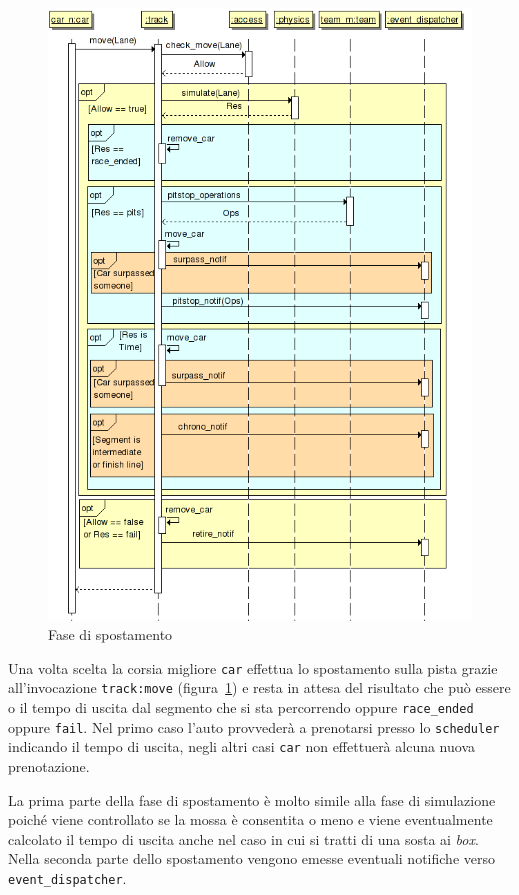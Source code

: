 \documentclass[11pt,a4paper]{report}
\newcommand{\fun}[1]{\texttt{#1}}
\begin{document}
\begin{figure}
\includegraphics[width=\textwidth]{diagrammi/Move}
\caption{Fase di spostamento}
\label{fig:move}
\end{figure}

Una volta scelta la corsia migliore \texttt{car} effettua lo spostamento sulla pista grazie all'invocazione \fun{track:move} (figura~\ref{fig:move}) e resta in attesa del risultato che può essere o il tempo di uscita dal segmento che si sta percorrendo oppure \texttt{race\_ended} oppure \texttt{fail}. Nel primo caso l'auto provvederà a prenotarsi presso lo \texttt{scheduler} indicando il tempo di uscita, negli altri casi \texttt{car} non effettuerà alcuna nuova prenotazione.

La prima parte della fase di spostamento è molto simile alla fase di simulazione poiché viene controllato se la mossa è consentita o meno e viene eventualmente calcolato il tempo di uscita anche nel caso in cui si tratti di una sosta ai \textit{box}. Nella seconda parte dello spostamento vengono emesse eventuali notifiche verso \texttt{event\_dispatcher}.
\end{document}
